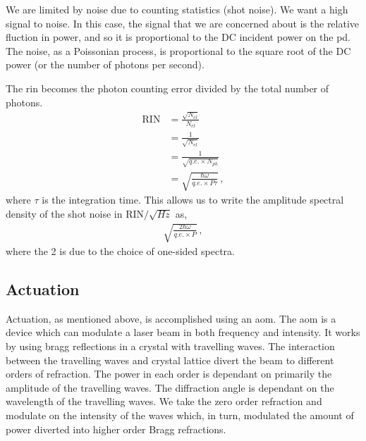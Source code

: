 We are limited by noise due to counting statistics (shot noise). We want a high signal
to noise. In this case, the signal that we are concerned about is the
relative fluction in power, and so it is proportional to the DC incident
power on the \ac{pd}. The noise, as a Poissonian process, is proportional
to the square root of the DC power (or the number of photons per second).

The \ac{rin} becomes the photon counting error divided by the total number
of photons.
\begin{align}
\mathrm{RIN} &= \frac{\sqrt{N_{el}}}{N_{el}} \\
     &= \frac{1}{\sqrt{N_{el}}} \\
     &= \frac{1}{\sqrt{q.e. \times N_{ph}}} \\
     &= \sqrt{\frac{\hbar \omega}{q.e. \times P \tau}} \, ,
\end{align}
where $\tau$ is the integration time. This allows us to write the amplitude
spectral density of the shot noise in $\mathrm{RIN} / \sqrt{H\!z}$ as,
\begin{align}
\sqrt{\frac{2 \hbar \omega}{q.e. \times P}} \, ,
\end{align}
where the 2 is due to the choice of one-sided spectra.

% 

\subsection{Actuation}

Actuation, as mentioned above, is accomplished using an \ac{aom}. The
\ac{aom} is a device which can modulate a laser beam in both frequency
and intensity. It works by using bragg reflections in a crystal with
travelling waves. The interaction between the travelling waves and crystal
lattice divert the beam to different orders of refraction. The power in each
order is dependant on primarily the amplitude of the travelling waves. The
diffraction angle is dependant on the wavelength of the travelling waves.
We take the zero order refraction and modulate on the intensity of the
waves which, in turn, modulated the amount of power diverted into higher order
Bragg refractions.


